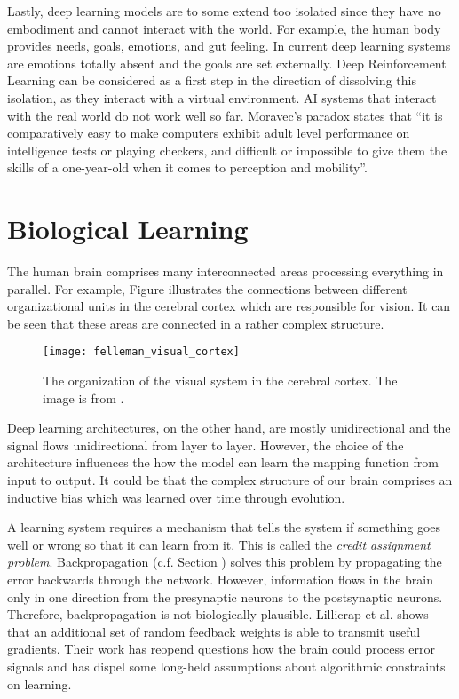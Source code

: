 Lastly, deep learning models are to some extend too isolated since they have no embodiment and cannot interact with the world.
For example, the human body provides needs, goals, emotions, and gut feeling.
In current deep learning systems are emotions totally absent and the goals are set externally.
Deep Reinforcement Learning can be considered as a first step in the direction of dissolving this isolation, as they interact with a virtual environment. 
AI systems that interact with the real world do not work well so far.
Moravec's paradox  states that ``it is comparatively easy to make computers exhibit adult level performance on intelligence tests or playing checkers, and difficult or impossible to give them the skills of a one-year-old when it comes to perception and mobility''.


\section{Biological Learning}
The human brain comprises many interconnected areas processing everything in parallel.
For example, Figure  illustrates the connections between different organizational units in the cerebral cortex which are responsible for vision.
It can be seen that these areas are connected in a rather complex structure.
\begin{figure}[h]
    \centering
    \texttt{[image: felleman\_visual\_cortex]}
    \caption[Organization of the visual system in the cerebral cortex]{The organization of the visual system in the cerebral cortex. The image is from .}
\end{figure}
Deep learning architectures, on the other hand, are mostly unidirectional and the signal flows unidirectional from layer to layer.
However, the choice of the architecture influences the how the model can learn the mapping function from input to output.
It could be that the complex structure of our brain comprises an inductive bias which was learned over time through evolution.

A learning system requires a mechanism that tells the system if something goes well or wrong so that it can learn from it.
This is called the \emph{credit assignment problem}.
Backpropagation (c.f. Section ) solves this problem by propagating the error backwards through the network.
However, information flows in the brain only in one direction from the presynaptic neurons to the postsynaptic neurons.
Therefore, backpropagation is not biologically plausible.
Lillicrap et al.  shows that an additional set of random feedback weights is able to transmit useful gradients.
Their work has reopend questions how the brain could process error signals and has dispel some long-held assumptions about algorithmic constraints on learning.


